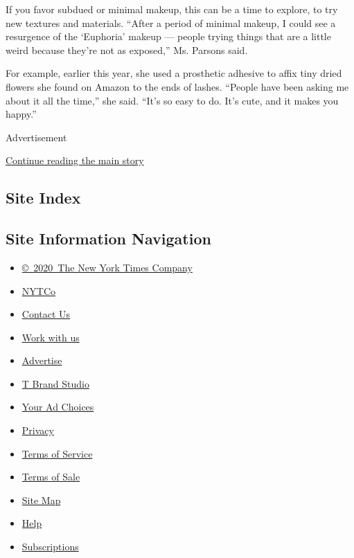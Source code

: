 If you favor subdued or minimal makeup, this can be a time to explore,
to try new textures and materials. ``After a period of minimal makeup, I
could see a resurgence of the `Euphoria' makeup --- people trying things
that are a little weird because they're not as exposed,'' Ms. Parsons
said.

For example, earlier this year, she used a prosthetic adhesive to affix
tiny dried flowers she found on Amazon to the ends of lashes. ``People
have been asking me about it all the time,'' she said. ``It's so easy to
do. It's cute, and it makes you happy.''

Advertisement

\protect\hyperlink{after-bottom}{Continue reading the main story}

\hypertarget{site-index}{%
\subsection{Site Index}\label{site-index}}

\hypertarget{site-information-navigation}{%
\subsection{Site Information
Navigation}\label{site-information-navigation}}

\begin{itemize}
\tightlist
\item
  \href{https://help.nytimes.com/hc/en-us/articles/115014792127-Copyright-notice}{©~2020~The
  New York Times Company}
\end{itemize}

\begin{itemize}
\tightlist
\item
  \href{https://www.nytco.com/}{NYTCo}
\item
  \href{https://help.nytimes.com/hc/en-us/articles/115015385887-Contact-Us}{Contact
  Us}
\item
  \href{https://www.nytco.com/careers/}{Work with us}
\item
  \href{https://nytmediakit.com/}{Advertise}
\item
  \href{http://www.tbrandstudio.com/}{T Brand Studio}
\item
  \href{https://www.nytimes.com/privacy/cookie-policy\#how-do-i-manage-trackers}{Your
  Ad Choices}
\item
  \href{https://www.nytimes.com/privacy}{Privacy}
\item
  \href{https://help.nytimes.com/hc/en-us/articles/115014893428-Terms-of-service}{Terms
  of Service}
\item
  \href{https://help.nytimes.com/hc/en-us/articles/115014893968-Terms-of-sale}{Terms
  of Sale}
\item
  \href{https://spiderbites.nytimes.com}{Site Map}
\item
  \href{https://help.nytimes.com/hc/en-us}{Help}
\item
  \href{https://www.nytimes.com/subscription?campaignId=37WXW}{Subscriptions}
\end{itemize}
